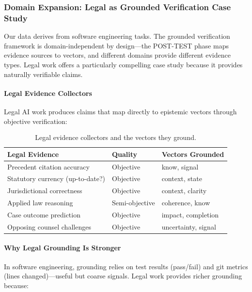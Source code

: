 \subsubsection{Domain Expansion: Legal as Grounded Verification Case Study}

Our data derives from software engineering tasks. The grounded verification framework is domain-independent by design---the POST-TEST phase maps evidence sources to vectors, and different domains provide different evidence types. Legal work offers a particularly compelling case study because it provides naturally verifiable claims.

\paragraph{Legal Evidence Collectors}

Legal AI work produces claims that map directly to epistemic vectors through objective verification:

\begin{table}[h]
\centering
\begin{tabular}{lll}
\toprule
\textbf{Legal Evidence} & \textbf{Quality} & \textbf{Vectors Grounded} \\
\midrule
Precedent citation accuracy & Objective & know, signal \\
Statutory currency (up-to-date?) & Objective & context, state \\
Jurisdictional correctness & Objective & context, clarity \\
Applied law reasoning & Semi-objective & coherence, know \\
Case outcome prediction & Objective & impact, completion \\
Opposing counsel challenges & Objective & uncertainty, signal \\
\bottomrule
\end{tabular}
\caption{Legal evidence collectors and the vectors they ground.}
\label{tab:legal-evidence}
\end{table}

\paragraph{Why Legal Grounding Is Stronger}

In software engineering, grounding relies on test results (pass/fail) and git metrics (lines changed)---useful but coarse signals. Legal work provides richer grounding because:

